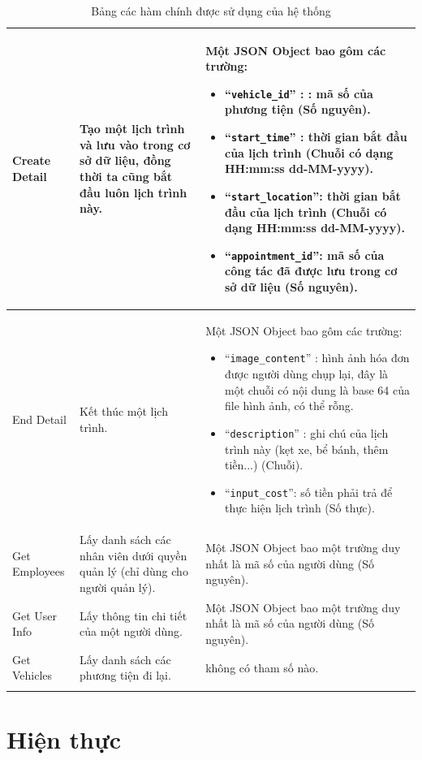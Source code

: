 \documentclass{article}
\begin{document}
\begin{longtable}{ | p{} |p{} | p{}  | }
\hline
Create Detail & 
Tạo một lịch trình và lưu vào trong cơ sở dữ liệu, đồng thời ta cũng bắt đầu luôn lịch trình này. &
Một JSON Object bao gôm các trường: 
\begin{itemize}
  \item “\verb|vehicle_id|” : : mã số của phương tiện (Số nguyên).  
  \item “\verb|start_time|” : thời gian bắt đầu của lịch trình (Chuỗi  có dạng HH:mm:ss dd-MM-yyyy).
  \item “\verb|start_location|”: thời gian bắt đầu của lịch trình (Chuỗi  có dạng HH:mm:ss dd-MM-yyyy).
  \item “\verb|appointment_id|”: mã số của công tác đã được lưu trong cơ sở dữ liệu (Số  nguyên). 
\end{itemize}
\\ 


\hline
End Detail  & 
Kết thúc một lịch trình. &
Một JSON Object bao gôm các trường: 
\begin{itemize}
  \item “\verb|image_content|” : hình ảnh hóa đơn được người dùng chụp lại, đây là một chuỗi có nội dung là base 64 của file hình ảnh, có thể rỗng. 
  \item “\verb|description|” : ghi chú của lịch trình này (kẹt xe, bể bánh, thêm tiền...) (Chuỗi).
  \item “\verb|input_cost|”: số tiền phải trả để thực hiện lịch trình (Số thực).
\end{itemize}
\\ 

\hline
Get Employees & 
Lấy danh sách các nhân viên dưới quyền quản lý (chỉ dùng cho người quản lý).&
Một JSON Object bao một trường duy nhất là mã số của người dùng (Số nguyên).
\\ 

\hline
Get User Info  & 
Lấy thông tin chi tiết của một người dùng. &
Một JSON Object bao một trường duy nhất là mã số của người dùng (Số nguyên).
\\

\hline
Get Vehicles   & 
Lấy danh sách các phương tiện đi lại. &
không có tham số nào.
\\
 
\hline

\caption{Bảng các hàm chính được sử dụng của hệ thống}
\end{longtable}

\section{Hiện thực}
\end{document}
